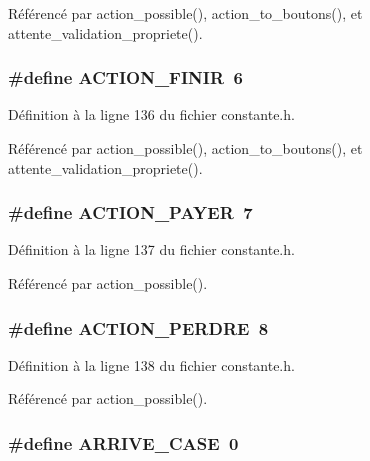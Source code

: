 R\'{e}f\'{e}renc\'{e} par action\_\-possible(), action\_\-to\_\-boutons(), et attente\_\-validation\_\-propriete().
\subsubsection{\setlength{\rightskip}{0pt plus 5cm}\#define ACTION\_\-FINIR~6}\label{constante_8h_f8301527651379bfb82e0f24b87039af}




D\'{e}finition \`{a} la ligne 136 du fichier constante.h.

R\'{e}f\'{e}renc\'{e} par action\_\-possible(), action\_\-to\_\-boutons(), et attente\_\-validation\_\-propriete().
\subsubsection{\setlength{\rightskip}{0pt plus 5cm}\#define ACTION\_\-PAYER~7}\label{constante_8h_a5b61153ee23ef8595687f124eccd712}




D\'{e}finition \`{a} la ligne 137 du fichier constante.h.

R\'{e}f\'{e}renc\'{e} par action\_\-possible().
\subsubsection{\setlength{\rightskip}{0pt plus 5cm}\#define ACTION\_\-PERDRE~8}\label{constante_8h_bfde18d0ae0bfe533fdb0b3dfcc7a865}




D\'{e}finition \`{a} la ligne 138 du fichier constante.h.

R\'{e}f\'{e}renc\'{e} par action\_\-possible().
\subsubsection{\setlength{\rightskip}{0pt plus 5cm}\#define ARRIVE\_\-CASE~0}\label{constante_8h_385bdcf434c8769e73b1733a2972f23c}




